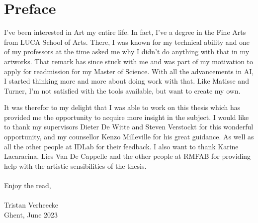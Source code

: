 \chapter*{Preface}

I've been interested in Art my entire life. In fact, I've a degree in the Fine Arts from LUCA School of Arts.
There, I was known for my technical ability and one of my professors at the time asked me why I didn't do anything with that in my artworks.
That remark has since stuck with me and was part of my motivation to apply for readmission for my Master of Science.
With all the advancements in AI, I started thinking more and more about doing work with that.
Like Matisse and Turner, I'm not satisfied with the tools available, but want to create my own.

It was therefor to my delight that I was able to work on this thesis which has provided me the opportunity to acquire more insight in the subject.
I would like to thank my supervisors Dieter De Witte and Steven Verstockt for this wonderful opportunity,
and my counsellor Kenzo Milleville for his great guidance. As well as all the other people at IDLab for their feedback.
I also want to thank Karine Lacaracina, Lies Van De Cappelle and the other people at RMFAB for providing help with the artistic sensibilities of the thesis.
\\
\\
Enjoy the read,
\\
\\
Tristan Verheecke\\
Ghent, June 2023